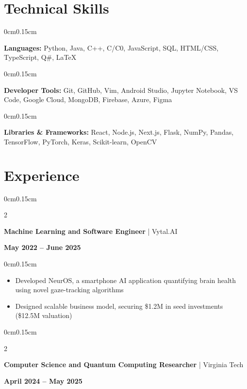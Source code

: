 \documentclass[10pt, letterpaper]{article}
\newenvironment{highlights}{
    \begin{itemize}[topsep=0pt, parsep=0pt, partopsep=0pt, itemsep=0pt, leftmargin=0.4cm]
}{
    \end{itemize}
}
\newenvironment{onecolentry}{
    \begin{adjustwidth}{0cm}{0.15cm}
}{
    \end{adjustwidth}
}
\newenvironment{twocolentry}[2][]{
    \onecolentry
    \def\secondColumn{#2}
    \setcolumnwidth{\fill, 4cm}
    \begin{paracol}{2}
}{
    \switchcolumn \raggedleft \secondColumn
    \end{paracol}
    \endonecolentry
}
\begin{document}
    \vspace{0.05cm}

    \section{Technical Skills}
    \vspace{0.05cm}

    \begin{onecolentry}
        \textbf{Languages:} Python, Java, C++, C/C0, JavaScript, SQL, HTML/CSS, TypeScript, Q\#, LaTeX
    \end{onecolentry}

    \begin{onecolentry}
        \textbf{Developer Tools:} Git, GitHub, Vim, Android Studio, Jupyter Notebook, VS Code, Google Cloud, MongoDB, Firebase, Azure, Figma
    \end{onecolentry}

    \begin{onecolentry}
        \textbf{Libraries \& Frameworks:} React, Node.js, Next.js, Flask, NumPy, Pandas, TensorFlow, PyTorch, Keras, Scikit-learn, OpenCV
    \end{onecolentry}

    \vspace{0.05cm}

    \section{Experience}
    \vspace{0.05cm}

    \begin{twocolentry}{\textbf{May 2022 -- June 2025}}
        \textbf{Machine Learning and Software Engineer} | Vytal.AI
    \end{twocolentry}

    \begin{onecolentry}
        \begin{highlights}
            \item Developed NeurOS, a smartphone AI application quantifying brain health using novel gaze-tracking algorithms
            \item Designed scalable business model, securing \$1.2M in seed investments (\$12.5M valuation)
        \end{highlights}
    \end{onecolentry}

    \vspace{0.05cm}
    \begin{twocolentry}{\textbf{April 2024 -- May 2025}}
        \textbf{Computer Science and Quantum Computing Researcher} | Virginia Tech
    \end{twocolentry}
\end{document}
